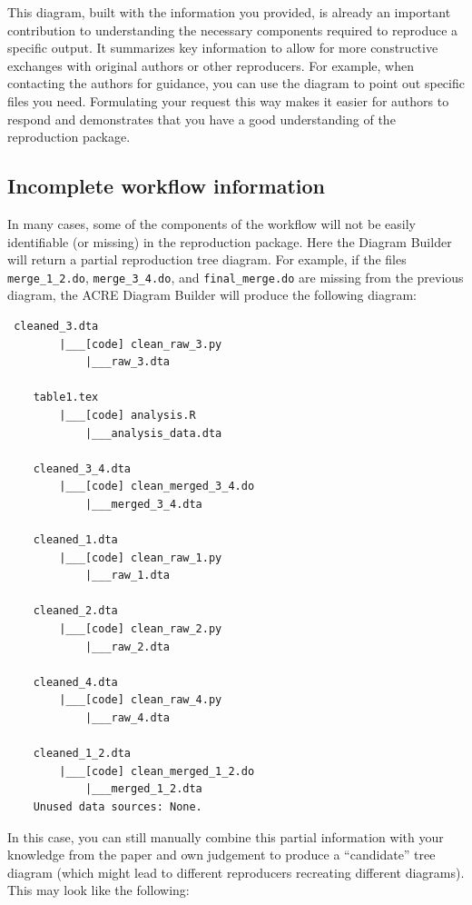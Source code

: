 \documentclass[]{book}
\begin{document}
This diagram, built with the information you provided, is already an important contribution to understanding the necessary components required to reproduce a specific output. It summarizes key information to allow for more constructive exchanges with original authors or other reproducers. For example, when contacting the authors for guidance, you can use the diagram to point out specific files you need. Formulating your request this way makes it easier for authors to respond and demonstrates that you have a good understanding of the reproduction package.

\hypertarget{incomplete-workflow-information}{%
\subsection{Incomplete workflow information}\label{incomplete-workflow-information}}

In many cases, some of the components of the workflow will not be easily identifiable (or missing) in the reproduction package. Here the Diagram Builder will return a partial reproduction tree diagram. For example, if the files \texttt{merge\_1\_2.do}, \texttt{merge\_3\_4.do}, and \texttt{final\_merge.do} are missing from the previous diagram, the ACRE Diagram Builder will produce the following diagram:

\begin{verbatim}
 cleaned_3.dta
        |___[code] clean_raw_3.py
            |___raw_3.dta

    table1.tex
        |___[code] analysis.R
            |___analysis_data.dta

    cleaned_3_4.dta
        |___[code] clean_merged_3_4.do
            |___merged_3_4.dta

    cleaned_1.dta
        |___[code] clean_raw_1.py
            |___raw_1.dta

    cleaned_2.dta
        |___[code] clean_raw_2.py
            |___raw_2.dta

    cleaned_4.dta
        |___[code] clean_raw_4.py
            |___raw_4.dta

    cleaned_1_2.dta
        |___[code] clean_merged_1_2.do
            |___merged_1_2.dta
    Unused data sources: None.
\end{verbatim}

In this case, you can still manually combine this partial information with your knowledge from the paper and own judgement to produce a ``candidate'' tree diagram (which might lead to different reproducers recreating different diagrams). This may look like the following:
\end{document}
